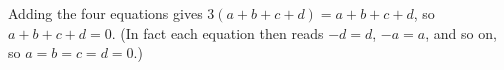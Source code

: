 Adding the four equations gives $3(a+b+c+d)=a+b+c+d$, so $a+b+c+d=\boxed{0}$. (In fact each equation then reads $-d=d$, $-a=a$, and so on, so $a=b=c=d=0$.)

